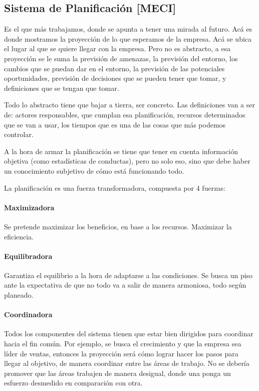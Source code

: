 \hypertarget{sistema-de-planificaciuxf3n-meci}{%
\subsection{Sistema de Planificación
{[}MECI{]}}\label{sistema-de-planificaciuxf3n-meci}}

Es el que más trabajamos, donde se apunta a tener una mirada al futuro.
Acá es donde mostramos la proyección de lo que esperamos de la empresa.
Acá se ubica el lugar al que se quiere llegar con la empresa. Pero no es
abstracto, a esa proyección se le suma la previsión de amenazas, la
previsión del entorno, los cambios que se puedan dar en el entorno, la
previsión de las potenciales oportunidades, previsión de decisiones que
se pueden tener que tomar, y definiciones que se tengan que tomar.

Todo lo abstracto tiene que bajar a tierra, ser concreto. Las
definiciones van a ser de: actores responsables, que cumplan esa
planificación, recursos determinados que se van a usar, los tiempos que
es una de las cosas que más podemos controlar.

A la hora de armar la planificación se tiene que tener en cuenta
información objetiva (como estadísticas de conductas), pero no solo eso,
sino que debe haber un conocimiento subjetivo de cómo está funcionando
todo.

La planificación es una fuerza transformadora, compuesta por 4 fuerzas:

\hypertarget{maximizadora}{%
\paragraph{Maximizadora}\label{maximizadora}}
Se pretende maximizar los beneficios, en base a
los recursos. Maximizar la eficiencia. 

\hypertarget{equilibradora}{%
\paragraph{Equilibradora}\label{equilibradora}}
Garantiza el equilibrio a la hora de adaptarse a las condiciones. Se
busca un piso ante la expectativa de que no todo va a salir de manera
armoniosa, todo según planeado. 

\hypertarget{coordinadora}{%
\paragraph{Coordinadora}\label{coordinadora}}
Todos los
componentes del sistema tienen que estar bien dirigidos para coordinar
hacia el fin común. Por ejemplo, se busca el crecimiento y que la
empresa sea líder de ventas, entonces la proyección será cómo lograr
hacer los pasos para llegar al objetivo, de manera coordinar entre las
áreas de trabajo. No se debería promover que las áreas trabajen de
manera desigual, donde una ponga un esfuerzo desmedido en comparación
con otra.

